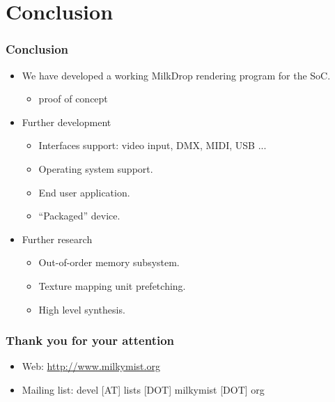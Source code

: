 \documentclass{beamer}
\begin{document}
\section{Conclusion}
\frame
{
  \frametitle{Conclusion}
  \begin{itemize}
  \item We have developed a working MilkDrop rendering program for the SoC.
  \begin{itemize}
  \item proof of concept
  \end{itemize}
  \item Further development
  \begin{itemize}
  \item Interfaces support: video input, DMX, MIDI, USB ...
  \item Operating system support.
  \item End user application.
  \item ``Packaged'' device.
  \end{itemize}
  \item Further research
  \begin{itemize}
  \item Out-of-order memory subsystem.
  \item Texture mapping unit prefetching.
  \item High level synthesis.
  \end{itemize}
  \end{itemize}
}

\frame
{
  \frametitle{Thank you for your attention}
  \begin{itemize}
  \item Web: \url{http://www.milkymist.org}
  \item Mailing list: devel [AT] lists [DOT] milkymist [DOT] org
  \end{itemize}

  \begin{center}
  \end{center}
}
\end{document}
